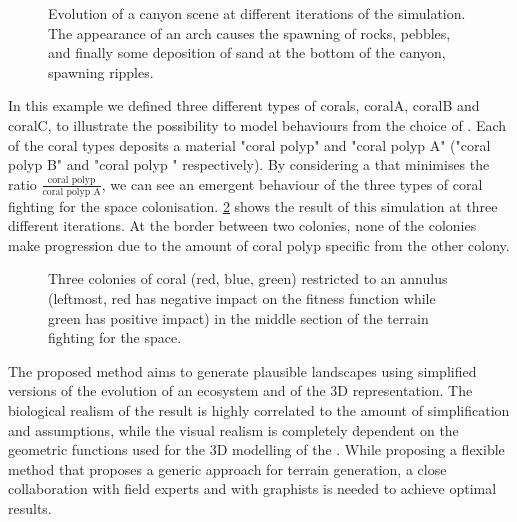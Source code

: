 \begin{figure}
    \caption{Evolution of a canyon scene at different iterations of the simulation. The appearance of an arch causes the spawning of rocks, pebbles, and finally some deposition of sand at the bottom of the canyon, spawning ripples.}
    \label{fig:env-obj-canyon-scene}
\end{figure}

In this example we defined three different types of corals, coralA, coralB and coralC, to illustrate the possibility to model behaviours from the choice of . Each of the coral types deposits a material "coral polyp" and "coral polyp A" ("coral polyp B" and "coral polyp \curve" respectively). By considering a  that minimises the ratio $\frac{\text{coral polyp}}{\text{coral polyp A}}$, we can see an emergent behaviour of the three types of coral fighting for the space colonisation.
\cref{fig:env-obj-coral-colonization-scene} shows the result of this simulation at three different iterations. At the border between two colonies, none of the colonies make progression due to the amount of coral polyp specific from the other colony.

\begin{figure}
    \caption{Three colonies of coral (red, blue, green) restricted to an annulus (leftmost, red has negative impact on the fitness function while green has positive impact) in the middle section of the terrain fighting for the space.}
    \label{fig:env-obj-coral-colonization-scene}
\end{figure}

The proposed method aims to generate plausible landscapes using simplified versions of the evolution of an ecosystem and of the 3D representation. The biological realism of the result is highly correlated to the amount of simplification and assumptions, while the visual realism is completely dependent on the geometric functions used for the 3D modelling of the . While proposing a flexible method that proposes a generic approach for terrain generation, a close collaboration with field experts and with graphists is needed to achieve optimal results.

